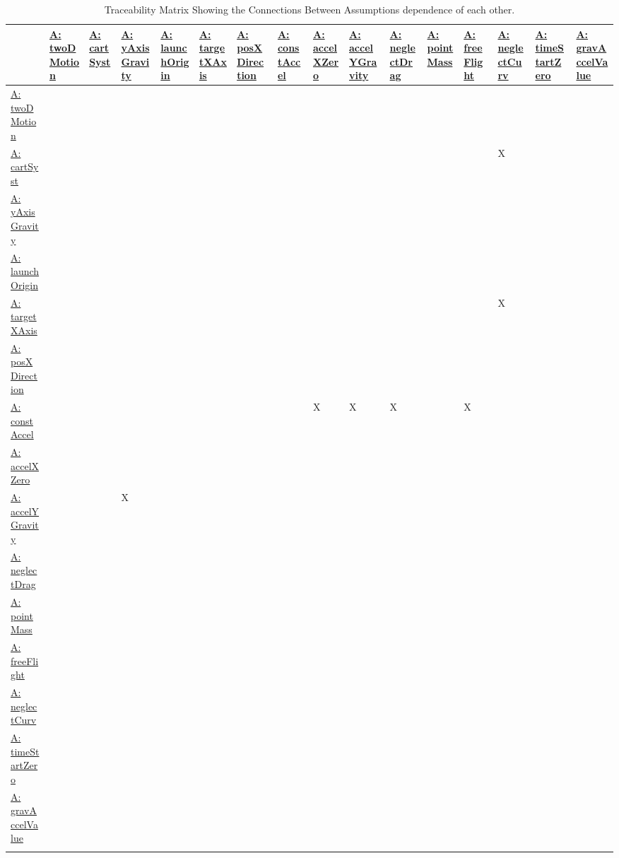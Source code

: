 \documentclass[12pt]{article}
\begin{document}
\begin{longtable}{l l l l l l l l l l l l l l l l}
\toprule
\textbf{} & \textbf{\hyperref[twoDMotion]{A: twoDMotion}} & \textbf{\hyperref[cartSyst]{A: cartSyst}} & \textbf{\hyperref[yAxisGravity]{A: yAxisGravity}} & \textbf{\hyperref[launchOrigin]{A: launchOrigin}} & \textbf{\hyperref[targetXAxis]{A: targetXAxis}} & \textbf{\hyperref[posXDirection]{A: posXDirection}} & \textbf{\hyperref[constAccel]{A: constAccel}} & \textbf{\hyperref[accelXZero]{A: accelXZero}} & \textbf{\hyperref[accelYGravity]{A: accelYGravity}} & \textbf{\hyperref[neglectDrag]{A: neglectDrag}} & \textbf{\hyperref[pointMass]{A: pointMass}} & \textbf{\hyperref[freeFlight]{A: freeFlight}} & \textbf{\hyperref[neglectCurv]{A: neglectCurv}} & \textbf{\hyperref[timeStartZero]{A: timeStartZero}} & \textbf{\hyperref[gravAccelValue]{A: gravAccelValue}}
\\
\midrule
\endhead
\hyperref[twoDMotion]{A: twoDMotion} &  &  &  &  &  &  &  &  &  &  &  &  &  &  & 
\\
\hyperref[cartSyst]{A: cartSyst} &  &  &  &  &  &  &  &  &  &  &  &  & X &  & 
\\
\hyperref[yAxisGravity]{A: yAxisGravity} &  &  &  &  &  &  &  &  &  &  &  &  &  &  & 
\\
\hyperref[launchOrigin]{A: launchOrigin} &  &  &  &  &  &  &  &  &  &  &  &  &  &  & 
\\
\hyperref[targetXAxis]{A: targetXAxis} &  &  &  &  &  &  &  &  &  &  &  &  & X &  & 
\\
\hyperref[posXDirection]{A: posXDirection} &  &  &  &  &  &  &  &  &  &  &  &  &  &  & 
\\
\hyperref[constAccel]{A: constAccel} &  &  &  &  &  &  &  & X & X & X &  & X &  &  & 
\\
\hyperref[accelXZero]{A: accelXZero} &  &  &  &  &  &  &  &  &  &  &  &  &  &  & 
\\
\hyperref[accelYGravity]{A: accelYGravity} &  &  & X &  &  &  &  &  &  &  &  &  &  &  & 
\\
\hyperref[neglectDrag]{A: neglectDrag} &  &  &  &  &  &  &  &  &  &  &  &  &  &  & 
\\
\hyperref[pointMass]{A: pointMass} &  &  &  &  &  &  &  &  &  &  &  &  &  &  & 
\\
\hyperref[freeFlight]{A: freeFlight} &  &  &  &  &  &  &  &  &  &  &  &  &  &  & 
\\
\hyperref[neglectCurv]{A: neglectCurv} &  &  &  &  &  &  &  &  &  &  &  &  &  &  & 
\\
\hyperref[timeStartZero]{A: timeStartZero} &  &  &  &  &  &  &  &  &  &  &  &  &  &  & 
\\
\hyperref[gravAccelValue]{A: gravAccelValue} &  &  &  &  &  &  &  &  &  &  &  &  &  &  & 
\\
\bottomrule
\caption{Traceability Matrix Showing the Connections Between Assumptions dependence of each other.}
\label{Table:TraceMatAvsA}
\end{longtable}
\end{document}
